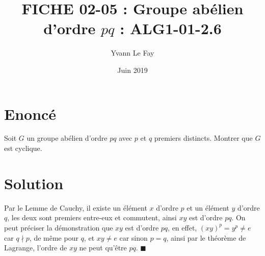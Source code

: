 \documentclass{article}
\newcommand*{\QED}{\hfill\ensuremath{\blacksquare}}%
\begin{document}
\title{FICHE 02-05 : Groupe abélien d'ordre $pq$ : ALG1-01-2.6}
\author{Yvann Le Fay}
\date{Juin 2019}
\maketitle
\section*{Enoncé}
Soit $G$ un groupe abélien d'ordre $pq$ avec $p$ et $q$ premiers distincts. Montrer que $G$ est cyclique.
\section*{Solution}
Par le Lemme de Cauchy, il existe un élément $x$ d'ordre $p$ et un élément $y$ d'ordre $q$, les deux sont premiers entre-eux et commutent, ainsi $xy$ est d'ordre $pq$.
On peut préciser la démonstration que $xy$ est d'ordre $pq$, en effet, $(xy)^p = y^p \neq e$ car $q\nmid p$, de même pour $q$, et $xy\neq e$ car sinon $p=q$, ainsi par le théorème de Lagrange, l'ordre de $xy$ ne peut qu'être $pq$.
\QED
\end{document}
